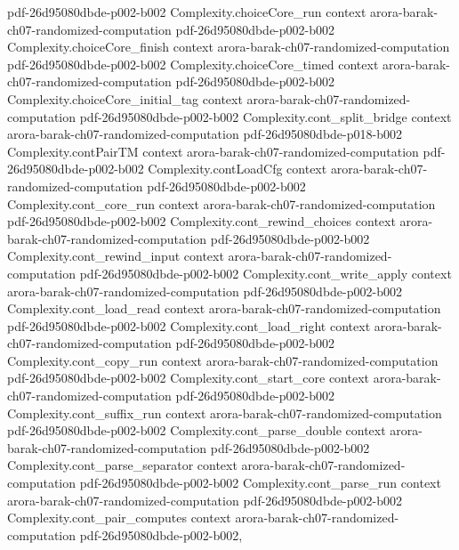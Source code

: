 \begin{theorem}
  {pdf-26d95080dbde-p002-b002}
\proofstep
  {Complexity.choiceCore_run}
  {context}
  {arora-barak-ch07-randomized-computation}
  {pdf-26d95080dbde-p002-b002}
\proofstep
  {Complexity.choiceCore_finish}
  {context}
  {arora-barak-ch07-randomized-computation}
  {pdf-26d95080dbde-p002-b002}
\proofstep
  {Complexity.choiceCore_timed}
  {context}
  {arora-barak-ch07-randomized-computation}
  {pdf-26d95080dbde-p002-b002}
\proofstep
  {Complexity.choiceCore_initial_tag}
  {context}
  {arora-barak-ch07-randomized-computation}
  {pdf-26d95080dbde-p002-b002}
\proofstep
  {Complexity.cont_split_bridge}
  {context}
  {arora-barak-ch07-randomized-computation}
  {pdf-26d95080dbde-p018-b002}
\proofstep
  {Complexity.contPairTM}
  {context}
  {arora-barak-ch07-randomized-computation}
  {pdf-26d95080dbde-p002-b002}
\proofstep
  {Complexity.contLoadCfg}
  {context}
  {arora-barak-ch07-randomized-computation}
  {pdf-26d95080dbde-p002-b002}
\proofstep
  {Complexity.cont_core_run}
  {context}
  {arora-barak-ch07-randomized-computation}
  {pdf-26d95080dbde-p002-b002}
\proofstep
  {Complexity.cont_rewind_choices}
  {context}
  {arora-barak-ch07-randomized-computation}
  {pdf-26d95080dbde-p002-b002}
\proofstep
  {Complexity.cont_rewind_input}
  {context}
  {arora-barak-ch07-randomized-computation}
  {pdf-26d95080dbde-p002-b002}
\proofstep
  {Complexity.cont_write_apply}
  {context}
  {arora-barak-ch07-randomized-computation}
  {pdf-26d95080dbde-p002-b002}
\proofstep
  {Complexity.cont_load_read}
  {context}
  {arora-barak-ch07-randomized-computation}
  {pdf-26d95080dbde-p002-b002}
\proofstep
  {Complexity.cont_load_right}
  {context}
  {arora-barak-ch07-randomized-computation}
  {pdf-26d95080dbde-p002-b002}
\proofstep
  {Complexity.cont_copy_run}
  {context}
  {arora-barak-ch07-randomized-computation}
  {pdf-26d95080dbde-p002-b002}
\proofstep
  {Complexity.cont_start_core}
  {context}
  {arora-barak-ch07-randomized-computation}
  {pdf-26d95080dbde-p002-b002}
\proofstep
  {Complexity.cont_suffix_run}
  {context}
  {arora-barak-ch07-randomized-computation}
  {pdf-26d95080dbde-p002-b002}
\proofstep
  {Complexity.cont_parse_double}
  {context}
  {arora-barak-ch07-randomized-computation}
  {pdf-26d95080dbde-p002-b002}
\proofstep
  {Complexity.cont_parse_separator}
  {context}
  {arora-barak-ch07-randomized-computation}
  {pdf-26d95080dbde-p002-b002}
\proofstep
  {Complexity.cont_parse_run}
  {context}
  {arora-barak-ch07-randomized-computation}
  {pdf-26d95080dbde-p002-b002}
\proofstep
  {Complexity.cont_pair_computes}
  {context}
  {arora-barak-ch07-randomized-computation}
  {pdf-26d95080dbde-p002-b002,
}
\end{theorem}
